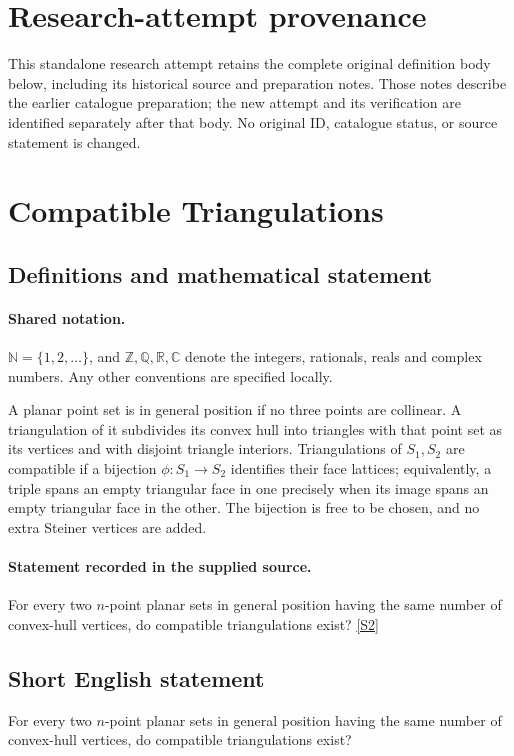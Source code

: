 \documentclass[11pt]{article}
\begin{document}
\section*{Research-attempt provenance}
This standalone research attempt retains the complete original definition body below,
including its historical source and preparation notes. Those notes describe the
earlier catalogue preparation; the new attempt and its verification are identified
separately after that body. No original ID, catalogue status, or source statement is changed.

\section{Compatible Triangulations}\label{statement}

\subsection{Definitions and mathematical statement}

\paragraph{Shared notation.}$\mathbb N=\{1,2,\ldots\}$, and $\mathbb Z,\mathbb Q,\mathbb R,\mathbb C$ denote the integers, rationals, reals and complex numbers. Any other conventions are specified locally.


A planar point set is in general position if no three points are collinear. A triangulation of it subdivides its convex hull into triangles with that point set as its vertices and with disjoint triangle interiors. Triangulations of $S_1,S_2$ are compatible if a bijection $\phi:S_1\to S_2$ identifies their face lattices; equivalently, a triple spans an empty triangular face in one precisely when its image spans an empty triangular face in the other. The bijection is free to be chosen, and no extra Steiner vertices are added.
\paragraph{Statement recorded in the supplied source.}
For every two $n$-point planar sets in general position having the same number of convex-hull vertices, do compatible triangulations exist? \href{https://github.com/edemaine/topp/blob/main/Problems/P.000038}{[S2]}
\subsection{Short English statement}
For every two $n$-point planar sets in general position having the same number of convex-hull vertices, do compatible triangulations exist?
\end{document}
